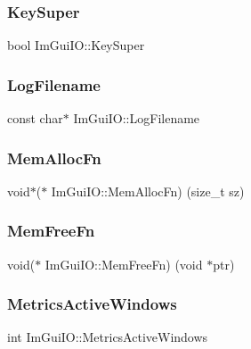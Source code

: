 \subsubsection{\texorpdfstring{Key\+Super}{KeySuper}}
{\footnotesize\ttfamily bool Im\+Gui\+I\+O\+::\+Key\+Super}

\hypertarget{struct_im_gui_i_o_ae77a1beed11820366800645232a6ad1c}{}\label{struct_im_gui_i_o_ae77a1beed11820366800645232a6ad1c} 
\subsubsection{\texorpdfstring{Log\+Filename}{LogFilename}}
{\footnotesize\ttfamily const char$\ast$ Im\+Gui\+I\+O\+::\+Log\+Filename}

\hypertarget{struct_im_gui_i_o_a352f6f0770974ee173f84d99d9e50a6e}{}\label{struct_im_gui_i_o_a352f6f0770974ee173f84d99d9e50a6e} 
\subsubsection{\texorpdfstring{Mem\+Alloc\+Fn}{MemAllocFn}}
{\footnotesize\ttfamily void$\ast$($\ast$ Im\+Gui\+I\+O\+::\+Mem\+Alloc\+Fn) (size\+\_\+t sz)}

\hypertarget{struct_im_gui_i_o_adb56df4e96ab8a9f1aefe8dd474ba0f5}{}\label{struct_im_gui_i_o_adb56df4e96ab8a9f1aefe8dd474ba0f5} 
\subsubsection{\texorpdfstring{Mem\+Free\+Fn}{MemFreeFn}}
{\footnotesize\ttfamily void($\ast$ Im\+Gui\+I\+O\+::\+Mem\+Free\+Fn) (void $\ast$ptr)}

\hypertarget{struct_im_gui_i_o_ae47a71018cc9b0c7b55912a4bfa9149c}{}\label{struct_im_gui_i_o_ae47a71018cc9b0c7b55912a4bfa9149c} 
\subsubsection{\texorpdfstring{Metrics\+Active\+Windows}{MetricsActiveWindows}}
{\footnotesize\ttfamily int Im\+Gui\+I\+O\+::\+Metrics\+Active\+Windows}

